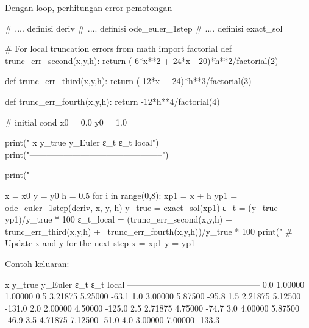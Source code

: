 Dengan loop, perhitungan error pemotongan
\begin{pythoncode}
# .... definisi deriv
# .... definisi ode_euler_1step
# .... definisi exact_sol

# For local truncation errors
from math import factorial
def trunc_err_second(x,y,h):
    return (-6*x**2 + 24*x - 20)*h**2/factorial(2)

def trunc_err_third(x,y,h):
    return (-12*x + 24)*h**3/factorial(3)

def trunc_err_fourth(x,y,h):
    return -12*h**4/factorial(4)

# initial cond
x0 = 0.0
y0 = 1.0

print("   x     y_true   y_Euler       ε_t   ε_t local")
print("-----------------------------------------------")

print("%

x = x0
y = y0
h = 0.5
for i in range(0,8):
    xp1 = x + h
    yp1 = ode_euler_1step(deriv, x, y, h)
    y_true = exact_sol(xp1)
    ε_t = (y_true - yp1)/y_true * 100
    ε_t_local = (trunc_err_second(x,y,h) + trunc_err_third(x,y,h) + \
        trunc_err_fourth(x,y,h))/y_true * 100
    print("%
    # Update x and y for the next step
    x = xp1
    y = yp1
\end{pythoncode}

Contoh keluaran:
\begin{textcode}
   x     y_true   y_Euler       ε_t   ε_t local
-----------------------------------------------
  0.0   1.00000   1.00000
  0.5   3.21875   5.25000     -63.1%
  1.0   3.00000   5.87500     -95.8%
  1.5   2.21875   5.12500    -131.0%
  2.0   2.00000   4.50000    -125.0%
  2.5   2.71875   4.75000     -74.7%
  3.0   4.00000   5.87500     -46.9%
  3.5   4.71875   7.12500     -51.0%
  4.0   3.00000   7.00000    -133.3%
\end{textcode}